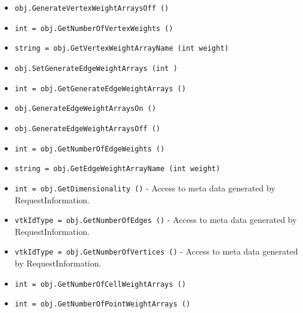 \begin{itemize}
\item  \verb|obj.GenerateVertexWeightArraysOff ()|

\item  \verb|int = obj.GetNumberOfVertexWeights ()|

\item  \verb|string = obj.GetVertexWeightArrayName (int weight)|

\item  \verb|obj.SetGenerateEdgeWeightArrays (int )|

\item  \verb|int = obj.GetGenerateEdgeWeightArrays ()|

\item  \verb|obj.GenerateEdgeWeightArraysOn ()|

\item  \verb|obj.GenerateEdgeWeightArraysOff ()|

\item  \verb|int = obj.GetNumberOfEdgeWeights ()|

\item  \verb|string = obj.GetEdgeWeightArrayName (int weight)|

\item  \verb|int = obj.GetDimensionality ()| -  Access to meta data generated by RequestInformation.

\item  \verb|vtkIdType = obj.GetNumberOfEdges ()| -  Access to meta data generated by RequestInformation.

\item  \verb|vtkIdType = obj.GetNumberOfVertices ()| -  Access to meta data generated by RequestInformation.

\item  \verb|int = obj.GetNumberOfCellWeightArrays ()|

\item  \verb|int = obj.GetNumberOfPointWeightArrays ()|

\end{itemize}
